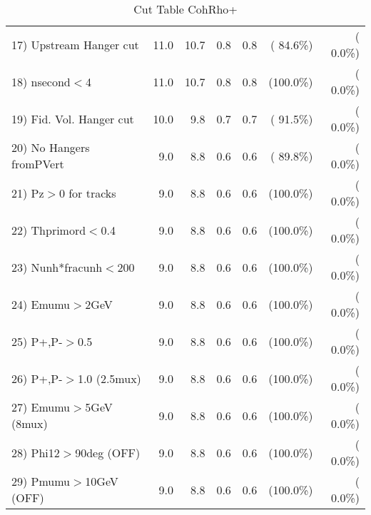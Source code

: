 \begin{table}[h!]
\begin{tabular}{||l||r|r|r|r|r|r||}
 17) Upstream Hanger cut  &         11.0 &         10.7 &          0.8 &          0.8 & ( 84.6\%) & (  0.0\%) \\
 18) nsecond$<$4          &         11.0 &         10.7 &          0.8 &          0.8 & (100.0\%) & (  0.0\%) \\
 19) Fid. Vol. Hanger cut &         10.0 &          9.8 &          0.7 &          0.7 & ( 91.5\%) & (  0.0\%) \\
 20) No Hangers fromPVert &          9.0 &          8.8 &          0.6 &          0.6 & ( 89.8\%) & (  0.0\%) \\
 21) Pz$>$0 for tracks    &          9.0 &          8.8 &          0.6 &          0.6 & (100.0\%) & (  0.0\%) \\
 22) Thprimord$<$0.4      &          9.0 &          8.8 &          0.6 &          0.6 & (100.0\%) & (  0.0\%) \\
 23) Nunh*fracunh$<$200   &          9.0 &          8.8 &          0.6 &          0.6 & (100.0\%) & (  0.0\%) \\
 24) Emumu$>$2GeV         &          9.0 &          8.8 &          0.6 &          0.6 & (100.0\%) & (  0.0\%) \\
 25) P+,P-$>$0.5          &          9.0 &          8.8 &          0.6 &          0.6 & (100.0\%) & (  0.0\%) \\
 26) P+,P-$>$1.0 (2.5mux) &          9.0 &          8.8 &          0.6 &          0.6 & (100.0\%) & (  0.0\%) \\
 27) Emumu$>$5GeV  (8mux) &          9.0 &          8.8 &          0.6 &          0.6 & (100.0\%) & (  0.0\%) \\
 28) Phi12$>$90deg  (OFF) &          9.0 &          8.8 &          0.6 &          0.6 & (100.0\%) & (  0.0\%) \\
 29) Pmumu$>$10GeV  (OFF) &          9.0 &          8.8 &          0.6 &          0.6 & (100.0\%) & (  0.0\%) \\
 \hline
 \hline
 \end{tabular}
 \caption{Cut Table  CohRho+  }
 \label{tab-cutcohjpsi-mumu_anumunc}
 \end{table}
